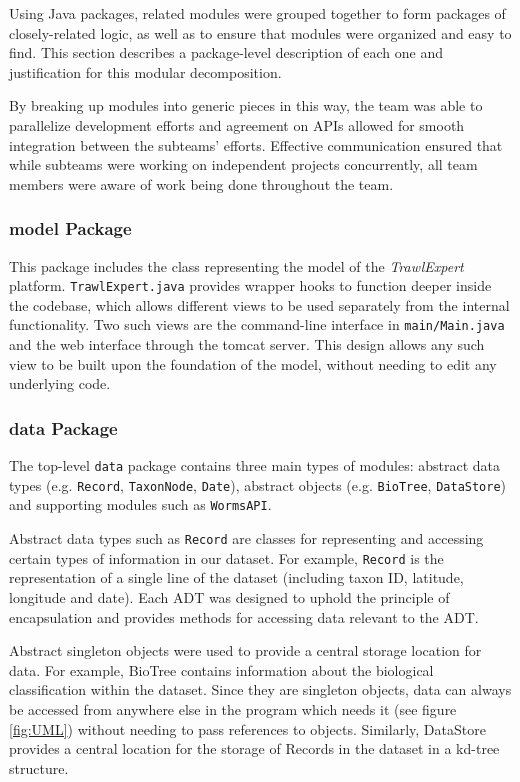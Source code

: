 \documentclass{article}
\begin{document}
Using Java packages, related modules were grouped together to form packages of closely-related logic, as well as to ensure that modules were organized and easy to find. This section describes a package-level description of each one and justification for this modular decomposition.

By breaking up modules into generic pieces in this way, the team was able to parallelize development efforts and agreement on APIs allowed for smooth integration between the subteams' efforts. Effective communication ensured that while subteams were working on independent projects concurrently, all team members were aware of work being done throughout the team.

\subsubsection{model Package}
This package includes the class representing the model of the \textit{TrawlExpert} platform. \texttt{TrawlExpert.java} provides wrapper hooks to function deeper inside the codebase, which allows different views to be used separately from the internal functionality. Two such views are the command-line interface in \texttt{main/Main.java} and the web interface through the tomcat server. This design allows any such view to be built upon the foundation of the model, without needing to edit any underlying code.

\subsubsection{data Package}
The top-level \texttt{data} package contains three main types of modules: abstract data types (e.g. \texttt{Record}, \texttt{TaxonNode}, \texttt{Date}), abstract objects (e.g. \texttt{BioTree}, \texttt{DataStore}) and supporting modules such as \texttt{WormsAPI}.

Abstract data types such as \texttt{Record} are classes for representing and accessing certain types of information in our dataset. For example, \texttt{Record} is the representation of a single line of the dataset (including taxon ID, latitude, longitude and date). Each ADT was designed to uphold the principle of encapsulation and provides methods for accessing data relevant to the ADT.

Abstract singleton objects were used to provide a central storage location for data. For example, BioTree contains information about the biological classification within the dataset. Since they are singleton objects, data can always be accessed from anywhere else in the program which needs it (see figure \ref{fig:UML}) without needing to pass references to objects. Similarly, DataStore provides a central location for the storage of Records in the dataset in a kd-tree structure.
\end{document}
